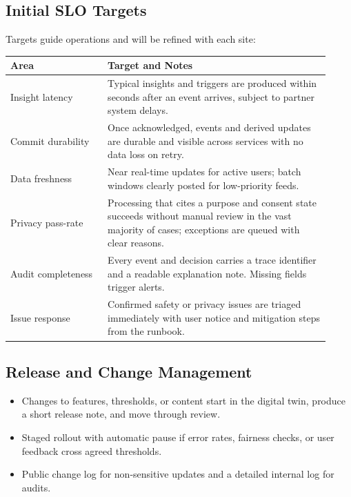 \documentclass[12pt]{article}
\begin{document}
\subsection*{Initial SLO Targets}
Targets guide operations and will be refined with each site:
\begin{longtable}{@{}p{0.28\linewidth}p{0.64\linewidth}@{}}
\toprule
\textbf{Area} & \textbf{Target and Notes} \\
\midrule
\endhead
Insight latency & Typical insights and triggers are produced within seconds after an event arrives, subject to partner system delays. \\
Commit durability & Once acknowledged, events and derived updates are durable and visible across services with no data loss on retry. \\
Data freshness & Near real-time updates for active users; batch windows clearly posted for low-priority feeds. \\
Privacy pass-rate & Processing that cites a purpose and consent state succeeds without manual review in the vast majority of cases; exceptions are queued with clear reasons. \\
Audit completeness & Every event and decision carries a trace identifier and a readable explanation note. Missing fields trigger alerts. \\
Issue response & Confirmed safety or privacy issues are triaged immediately with user notice and mitigation steps from the runbook. \\
\bottomrule
\end{longtable}

\subsection*{Release and Change Management}
\begin{itemize}[leftmargin=*]
  \item Changes to features, thresholds, or content start in the digital twin, produce a short release note, and move through review.
  \item Staged rollout with automatic pause if error rates, fairness checks, or user feedback cross agreed thresholds.
  \item Public change log for non-sensitive updates and a detailed internal log for audits.
\end{itemize}


\end{document}

